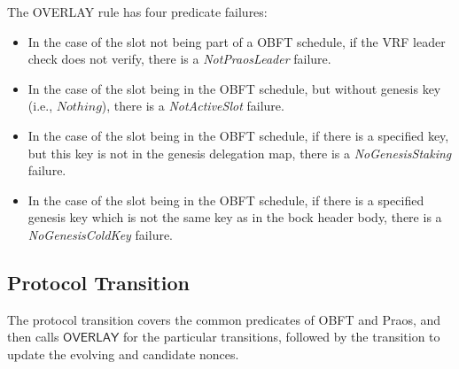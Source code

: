 The OVERLAY rule has four predicate failures:
\begin{itemize}
\item In the case of the slot not being part of a OBFT schedule, if the VRF
  leader check does not verify, there is a \emph{NotPraosLeader} failure.
\item In the case of the slot being in the OBFT schedule, but without genesis
  key (i.e., $Nothing$), there is a \emph{NotActiveSlot} failure.
\item In the case of the slot being in the OBFT schedule, if there is a
  specified key, but this key is not in the genesis delegation map, there is a
  \emph{NoGenesisStaking} failure.
\item In the case of the slot being in the OBFT schedule, if there is a
  specified genesis key which is not the same key as in the bock header body,
  there is a \emph{NoGenesisColdKey} failure.
\end{itemize}

\clearpage

\subsection{Protocol Transition}
\label{sec:protocol-trans}

The protocol transition covers the common predicates of OBFT and Praos,
and then calls $\mathsf{OVERLAY}$ for the particular transitions,
followed by the transition to update the evolving and candidate nonces.


